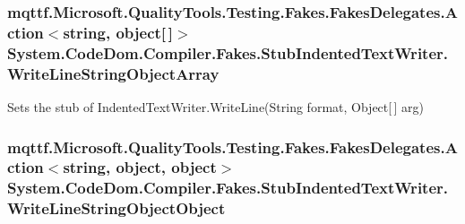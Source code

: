 \hypertarget{class_system_1_1_code_dom_1_1_compiler_1_1_fakes_1_1_stub_indented_text_writer_a894d993357523705628c6c06723f2452}{
\subsubsection[{Write\-Line\-String\-Object\-Array}]{\setlength{\rightskip}{0pt plus 5cm}mqttf.\-Microsoft.\-Quality\-Tools.\-Testing.\-Fakes.\-Fakes\-Delegates.\-Action$<$string, object\mbox{[}$\,$\mbox{]}$>$ System.\-Code\-Dom.\-Compiler.\-Fakes.\-Stub\-Indented\-Text\-Writer.\-Write\-Line\-String\-Object\-Array}}\label{class_system_1_1_code_dom_1_1_compiler_1_1_fakes_1_1_stub_indented_text_writer_a894d993357523705628c6c06723f2452}


Sets the stub of Indented\-Text\-Writer.\-Write\-Line(\-String format, Object\mbox{[}$\,$\mbox{]} arg)

\hypertarget{class_system_1_1_code_dom_1_1_compiler_1_1_fakes_1_1_stub_indented_text_writer_add691e51ecd610ac889333a435975f0c}{
\subsubsection[{Write\-Line\-String\-Object\-Object}]{\setlength{\rightskip}{0pt plus 5cm}mqttf.\-Microsoft.\-Quality\-Tools.\-Testing.\-Fakes.\-Fakes\-Delegates.\-Action$<$string, object, object$>$ System.\-Code\-Dom.\-Compiler.\-Fakes.\-Stub\-Indented\-Text\-Writer.\-Write\-Line\-String\-Object\-Object}}\label{class_system_1_1_code_dom_1_1_compiler_1_1_fakes_1_1_stub_indented_text_writer_add691e51ecd610ac889333a435975f0c}



